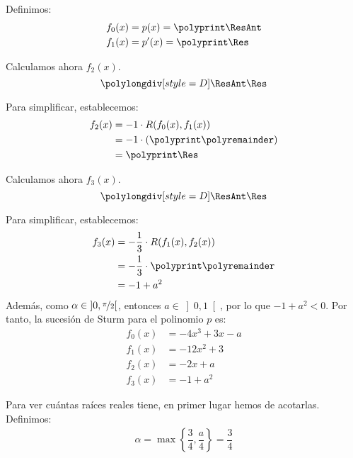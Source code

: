 \begin{ejercicio}
\begin{enumerate}
        Definimos:
        \polymul{}
        \polymul{}
        \begin{align*}
            f_0(x) &= p(x)=\polyprint\ResAnt\\
            f_1(x) &= p'(x)=\polyprint\Res
        \end{align*}

        Calculamos ahora $f_2(x)$.
        \begin{equation*}
            \polylongdiv[style=D]\ResAnt\Res
        \end{equation*}
        \polydiv\div\ResAnt\Res
        \polymul\ResAnt{}
        \polymul\Res{}

        Para simplificar, establecemos:
        \begin{align*}
            f_2(x) &= -1\cdot R(f_0(x), f_1(x))\\
            &= -1\cdot \left(\polyprint\polyremainder\right)\\
            &= \polyprint\Res
        \end{align*}

        Calculamos ahora $f_3(x)$.
        \begin{equation*}
            \polylongdiv[style=D]\ResAnt\Res
        \end{equation*}
        \polydiv\div\ResAnt\Res
        \polymul\ResAnt{}
        \polymul\Res{}

        Para simplificar, establecemos:
        \begin{align*}
            f_3(x) &= -\frac{1}{3}\cdot R(f_1(x), f_2(x))\\
            &= -\frac{1}{3}\cdot \polyprint\polyremainder\\
            &= -1+a^2
        \end{align*}
        Además, como $\alpha\in \left]0,\nicefrac{\pi}{2}\right[$, entonces $a\in \left]0, 1\right[$, por lo que $-1+a^2<0$. Por tanto, la sucesión de Sturm para el polinomio $p$ es:
        \begin{align*}
            f_0(x) &= -4x^3 + 3x - a\\
            f_1(x) &= -12x^2 + 3\\
            f_2(x) &= -2x+a\\
            f_3(x) &= -1+a^2
        \end{align*}

        Para ver cuántas raíces reales tiene, en primer lugar hemos de acotarlas. Definimos:
        \begin{align*}
            \alpha=\max\left\{\dfrac{3}{4},\dfrac{a}{4}\right\}=\dfrac{3}{4}
        \end{align*}
        

\end{enumerate}
\end{ejercicio}
